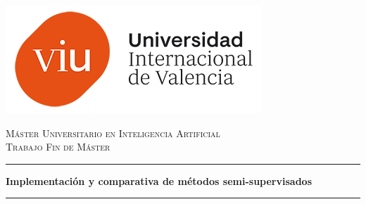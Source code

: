 %
\newcommand{\TITLE}{Implementación y comparativa de métodos semi-supervisados}
\newcommand{\SUBJECT}{Trabajo Fin de Máster}
\newcommand{\CAREER}{Máster Universitario en Inteligencia Artificial}
\newcommand{\CURSO}{2023-2024}
\newcommand{\AUTHORNAMEUNO}{David Martínez Acha}
\newcommand{\DNI}{71310644H}
\newcommand{\DIRECTORA}{Irma Sanabria}
\newcommand{\TUTORES}{Álvar Arnaiz \& César Ignacio García}
\newcommand{\CONV}{Septiembre 2024}

\begin{titlepage}
\begin{center}
    \centering

    \vspace*{0cm}

    \includegraphics[scale=3.2]{figuras/Logo_VIU.png}

    \vspace*{0.5cm}

    \textsc{\large \CAREER} \\
    \textsc{\large \SUBJECT} \\
    
    \vspace*{3cm}

    \par\noindent\rule{\textwidth}{0.4pt}
    \vspace*{0cm}

    \huge{\bfseries \TITLE} \\

    \par\noindent\rule{\textwidth}{0.4pt}

    \vspace*{1.25cm}
    

\end{center}
\end{titlepage}
